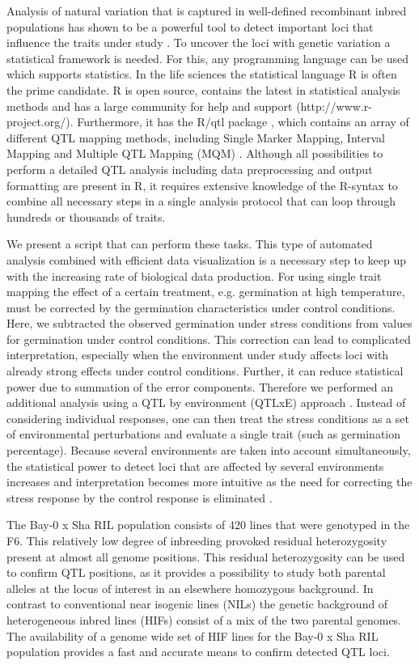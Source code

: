 Analysis of natural variation that is captured in well-defined recombinant inbred populations has 
shown to be a powerful tool to detect important loci that influence the traits under study 
\cite{Alonso-Blanco:2009}. To uncover the loci with genetic variation a statistical framework is 
needed. For this, any programming language can be used which supports statistics. In the life sciences 
the statistical language R is often the prime candidate. R is open source, contains the latest in 
statistical analysis methods and has a large community for help and support (http://www.r-project.org/). 
Furthermore, it has the R/qtl package \cite{Broman:2003}, which contains an array of different 
QTL mapping methods, including Single Marker Mapping, Interval Mapping and Multiple QTL Mapping (MQM) 
\cite{Arends:2010}. Although all possibilities to perform a detailed QTL analysis including data 
preprocessing and output formatting are present in R, it requires extensive knowledge of the R-syntax 
to combine all necessary steps in a single analysis protocol that can loop through hundreds or 
thousands of traits. 

We present a script that can perform these tasks. This type of automated analysis combined with 
efficient data visualization is a necessary step to keep up with the increasing rate of biological 
data production. For using single trait mapping the effect of a certain treatment, e.g. germination 
at high temperature, must be corrected by the germination characteristics under control conditions. 
Here, we subtracted the observed germination under stress conditions from values for germination 
under control conditions. This correction can lead to complicated interpretation, especially when the 
environment under study affects loci with already strong effects under control conditions. Further, 
it can reduce statistical power due to summation of the error components. Therefore we performed an 
additional analysis using a QTL by environment (QTLxE) approach \cite{Vargas:2006, Moreau:2004}. 
Instead of considering individual responses, one can then treat the stress conditions as a set of 
environmental perturbations and evaluate a single trait (such as germination percentage). Because 
several environments are taken into account simultaneously, the statistical power to detect loci 
that are affected by several environments increases and interpretation becomes more intuitive as the 
need for correcting the stress response by the control response is eliminated \cite{Boer:2007}.

The Bay-0 x Sha RIL population consists of 420 lines that were genotyped in the F6. This relatively 
low degree of inbreeding provoked residual heterozygosity present at almost all genome positions. 
This residual heterozygosity can be used to confirm QTL positions, as it provides a possibility to 
study both parental alleles at the locus of interest in an elsewhere homozygous background. 
In contrast to conventional near isogenic lines (NILs) the genetic background of heterogeneous 
inbred lines (HIFs) consist of a mix of the two parental genomes. The availability of a genome wide 
set of HIF lines for the Bay-0 x Sha RIL population provides a fast and accurate means to confirm 
detected QTL loci.

